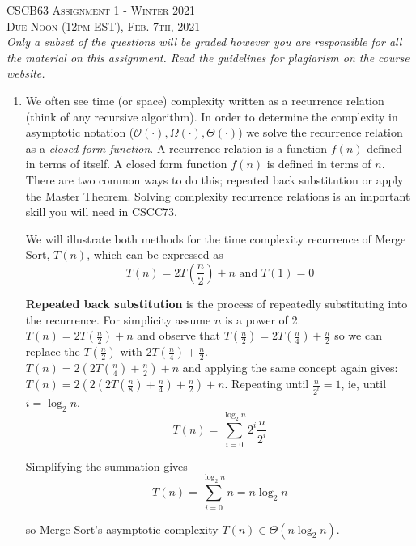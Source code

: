 \documentclass{article}
\begin{document}
\begin{center}
\textsc{\Large CSCB63 Assignment 1 - Winter 2021 \\[1.0ex]Due Noon (12pm EST), Feb. 7th, 2021}\\[1.0ex]
\textsl{Only a subset of the questions will be graded however you are responsible for all the material on this assignment.  Read the guidelines for plagiarism on the course website.}
\end{center}

\begin{enumerate}
\item We often see time (or space) complexity written as a recurrence relation (think of any recursive algorithm).  In order to determine the complexity in asymptotic notation ($\mathcal O(\cdot), \Omega (\cdot), \Theta(\cdot)$) we solve the recurrence relation as a \emph{closed form function}.  A recurrence relation is a function $f(n)$ defined in terms of itself. A closed form function $f(n)$ is defined in terms of $n$.  There are two common ways to do this; repeated back substitution or apply the Master Theorem.  Solving complexity recurrence relations is an important skill you will need in CSCC73. 

We will illustrate both methods for the time complexity recurrence of Merge Sort, $T(n)$, which can be expressed as \[T(n) = 2T(\frac{n}{2}) + n \textrm{  and } T(1) = 0\]

\textbf{Repeated back substitution} is the process of repeatedly substituting into the recurrence. For simplicity assume $n$ is a power of 2.\\

$T(n) =  2T(\frac{n}{2}) + n$ and observe that $ T(\frac{n}{2}) = 2T(\frac{n}{4}) + \frac{n}{2}$ so we can replace the $T(\frac{n}{2}) $ with $2T(\frac{n}{4}) + \frac{n}{2}$.\\

$T(n) = 2(2T(\frac{n}{4}) + \frac{n}{2}) + n$ and applying the same concept again gives:\\  

$T(n) = 2(2(2T(\frac{n}{8}) + \frac{n}{4}) + \frac{n}{2}) + n$. Repeating until $\frac{n}{2^i} = 1$, ie, until $i = \log_2 n$. \\

\[T(n) = \sum_{i=0}^{\log_2 n} 2^i\frac{n}{2^i}\]

Simplifying the summation gives \[ T(n) = \sum_{i=0}^{\log_2 n} n = n\log_2 n\]
 
 so Merge Sort's asymptotic complexity $T(n) \in \Theta(n\log_2 n)$. 
 


\end{enumerate}
\end{document}
